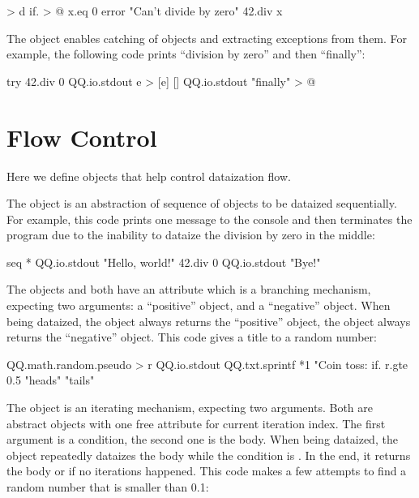 \documentclass[sigplan,nonacm]{acmart}
\newcommand\aff[1]{\ff{\textcolor{gray}{\(\star\)}#1}}
\newcommand\deff[1]{\ff{\textcolor{blue!50!black}{\textbf{#1}}}}
\newcommand\adeff[1]{\aff{\textcolor{blue!50!black}{\textbf{#1}}}}
\begin{document}
\begin{ffcode}
[x] > d
  if. > @
    x.eq 0
    error "Can't divide by zero"
    42.div x
\end{ffcode}

The \adeff{try} object enables catching of \aff{error} objects and extracting exceptions from them.
For example, the following code prints ``division by zero'' and then ``finally'':

\begin{ffcode}
try
  42.div 0
  QQ.io.stdout e > [e]
  []
    QQ.io.stdout "finally" > @
\end{ffcode}

\section{Flow Control}\label{sec:flow}

Here we define objects that help control dataization flow.

The \deff{seq} object is an abstraction of sequence of objects to be dataized sequentially.
For example, this code prints one message to the console and then terminates the program due to
the inability to dataize the division by zero in the middle:

\begin{ffcode}
seq *
  QQ.io.stdout "Hello, world!"
  42.div 0
  QQ.io.stdout "Bye!"
\end{ffcode}

The objects  and  both have an attribute \deff{if} which is a branching mechanism,
expecting two arguments: a ``positive'' object, and a ``negative'' object. When
being dataized, the object  always returns the ``positive'' object,
the object  always returns the ``negative'' object.
This code gives a title to a random number:

\begin{ffcode}
QQ.math.random.pseudo > r
QQ.io.stdout
  QQ.txt.sprintf *1
    "Coin toss: %
    if.
      r.gte 0.5
      "heads"
      "tails"
\end{ffcode}

The \deff{while} object is an iterating mechanism, expecting two arguments.
Both are abstract objects with one free attribute for current iteration index.
The first argument is a condition, the second one is the body.
When being dataized, the object  repeatedly dataizes the body while the condition is .
In the end, it returns the body or  if no iterations happened.
This code makes a few attempts to find a random number that is smaller than 0.1:
\end{document}
